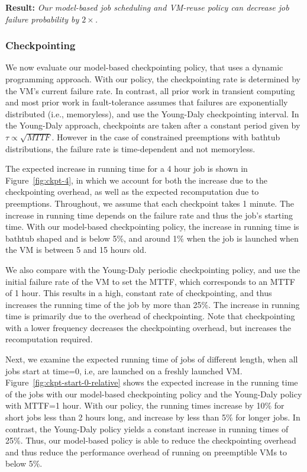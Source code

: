 \noindent \textbf{Result:} \emph{Our model-based job scheduling and VM-reuse policy can decrease job failure probability by $2\times$.}



\subsubsection{Checkpointing}
\label{subsec:eval-ckpt}

We now evaluate our model-based checkpointing policy, that uses a dynamic programming approach.
With our policy, the checkpointing rate is determined by the VM's current failure rate.
In contrast, all prior work in transient computing and most prior work in fault-tolerance assumes that failures are exponentially distributed (i.e., memoryless), and use the Young-Daly checkpointing interval.
In the Young-Daly approach, checkpoints are taken after a constant period given by $\tau \propto \sqrt{MTTF}$.
However in the case of constrained preemptions with bathtub distributions, the failure rate is time-dependent and not memoryless. 


The expected increase in running time for a 4 hour job is shown in Figure~\ref{fig:ckpt-4}, in which we account for both the increase due to the checkpointing overhead, as well as the expected recomputation due to preemptions. 
Throughout, we assume that each checkpoint takes 1 minute. 
The increase in running time depends on the failure rate and thus the job's starting time. 
With our model-based checkpointing policy, the increase in running time is bathtub shaped and is below 5\%, and around 1\% when the job is launched when the VM is between 5 and 15 hours old. 

We also compare with the Young-Daly periodic checkpointing policy, and use the initial failure rate of the VM to set the MTTF, which corresponds to an MTTF of 1 hour. 
This results in a high, constant rate of checkpointing, and thus increases the running time of the job by more than 25\%.
The increase in running time is primarily due to the overhead of checkpointing. 
Note that checkpointing with a lower frequency decreases the checkpointing overhead, but increases the recomputation required.

Next, we examine the expected running time of jobs of different length, when all jobs start at time=0, i.e, are launched on a freshly launched VM. 
Figure~\ref{fig:ckpt-start-0-relative} shows the expected increase in the running time of the jobs with our model-based checkpointing policy and the Young-Daly policy with MTTF=1 hour.
With our policy, the running times increase by 10\% for short jobs less than 2 hours long, and increase by less than 5\% for longer jobs.
In contrast, the Young-Daly policy yields a constant increase in running times of 25\%. 
Thus, our model-based policy is able to reduce the checkpointing overhead and thus reduce the performance overhead of running on preemptible VMs to below 5\%. 

